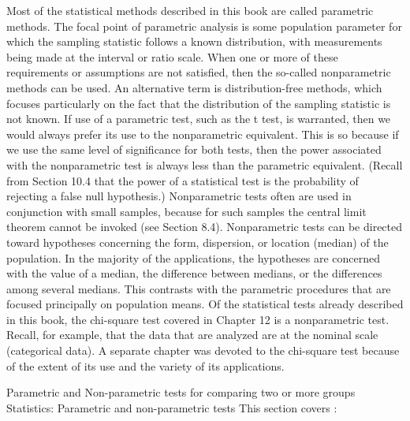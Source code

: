 Most of the statistical methods described in this book are called parametric methods. The focal point of
parametric analysis is some population parameter for which the sampling statistic follows a known distribution,
with measurements being made at the interval or ratio scale. When one or more of these requirements or
assumptions are not satisfied, then the so-called nonparametric methods can be used. An alternative term is
distribution-free methods, which focuses particularly on the fact that the distribution of the sampling statistic is
not known.
If use of a parametric test, such as the t test, is warranted, then we would always prefer its use to the
nonparametric equivalent. This is so because if we use the same level of significance for both tests, then the
power associated with the nonparametric test is always less than the parametric equivalent. (Recall from
Section 10.4 that the power of a statistical test is the probability of rejecting a false null hypothesis.)
Nonparametric tests often are used in conjunction with small samples, because for such samples the central
limit theorem cannot be invoked (see Section 8.4).
Nonparametric tests can be directed toward hypotheses concerning the form, dispersion, or location
(median) of the population. In the majority of the applications, the hypotheses are concerned with the value of a
median, the difference between medians, or the differences among several medians. This contrasts with the
parametric procedures that are focused principally on population means.
Of the statistical tests already described in this book, the chi-square test covered in Chapter 12 is a
nonparametric test. Recall, for example, that the data that are analyzed are at the nominal scale (categorical
data). A separate chapter was devoted to the chi-square test because of the extent of its use and the variety of its
applications.

Parametric and Non-parametric tests for comparing two or more groups
Statistics: Parametric and non-parametric tests
This section covers :

